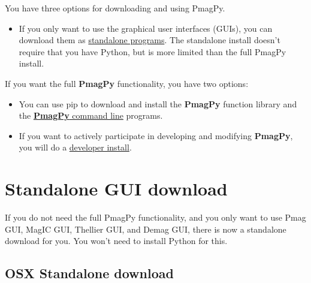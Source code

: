 \documentclass[11pt]{book}
\begin{document}
{%
You have three options for downloading and using PmagPy.

\begin{itemize}
\item If you only want to use the graphical user interfaces (GUIs), you can download them as  \href{#standalone}{standalone programs}.  The standalone install doesn't require that you have Python, but is more limited than the full PmagPy install.

\end{itemize}

If you want the full {\bf PmagPy} functionality, you have two options:

\begin{itemize}

  \item You can use pip to download and install the {\bf PmagPy} function library and the \href{#full_install}{{\bf PmagPy} command line} programs.

  \item If you want to actively participate in developing and modifying {\bf PmagPy}, you will do a \href{#full_install} {developer install}.
\end{itemize}


\section{Standalone GUI download}

If you do not need the full PmagPy functionality, and you only want to use Pmag GUI, MagIC GUI, Thellier GUI, and Demag GUI, there is now a standalone download for you.  You won't need to install Python for this.


\subsection{OSX Standalone download}

}
\end{document}
